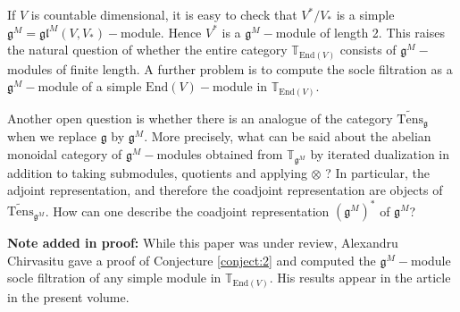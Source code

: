 \documentclass{svmult}
\newcommand{\TT}{\mathbb{T}}
\renewcommand{\gg}{\mathfrak{g}}
\newcommand{\gl}{\mathfrak{gl}}
\newcommand{\End}{\mathrm{End}}
\begin{document}
If $V$ is countable dimensional, it is easy to check that $V^*/V_*$ is a simple $\gg^M = \gl^M(V,V_*)-$module. Hence $V^*$ is a $\gg^M-$module of length 2. This raises the natural question of whether the entire category $\TT_{\End(V)}$ consists of $\gg^M-$modules of finite length. A further problem is to compute the socle filtration as a $\gg^M-$module of a simple $\End(V)-$module in $\TT_{\End(V)}$.

Another open question is whether there is an analogue of the category $\widetilde{\mathrm{Tens}}_{\gg}$ when we replace $\gg$ by $\gg^M$. More precisely, 
what can be said about the abelian monoidal category of $\gg^M-$modules obtained from $\TT_{\gg^M}$ by iterated dualization in addition to taking submodules, 
quotients and applying $\otimes$ ? In particular, the adjoint representation, and therefore the coadjoint representation are objects of 
$\widetilde{\mathrm{Tens}}_{\gg^M}$.  How can one describe the coadjoint representation $(\gg^M)^*$ of $\gg^M$?

\textbf{Note added in proof:} While this paper was under review, Alexandru Chirvasitu gave a proof of Conjecture \ref{conject:2} and computed the $\gg^M-$module socle filtration of any simple module in $\TT_{\End(V)}$. His results appear in the article \cite{C} in the present volume.
\end{document}
